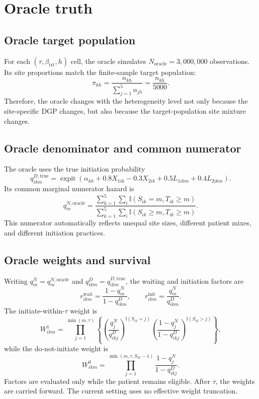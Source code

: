 \documentclass[11pt]{article}
\newcommand{\expit}{\operatorname{expit}}
\newcommand{\ind}{\mathbb{I}}
\begin{document}
\section{Oracle truth}

\subsection{Oracle target population}

For each $(\tau,\beta_{\mathrm{trt}},h)$ cell, the oracle simulates
$N_{\mathrm{oracle}}=3{,}000{,}000$ observations. Its site proportions match
the finite-sample target population:
\begin{equation}
\label{eq:site-weight}
  \pi_{kh}=\frac{n_{kh}}{\sum_{j=1}^5 n_{jh}}
           =\frac{n_{kh}}{5000}.
\end{equation}
Therefore, the oracle changes with the heterogeneity level not only because
the site-specific DGP changes, but also because the target-population site
mixture changes.

\subsection{Oracle denominator and common numerator}

The oracle uses the true initiation probability
\[
  q_{ikm}^{D,\mathrm{true}}
  =\expit\!\left(
      \alpha_{kh}+0.8X_{1ik}-0.3X_{2ik}
      +0.5L_{1ikm}+0.4L_{2ikm}
    \right).
\]
Its common marginal numerator hazard is
\begin{equation}
\label{eq:oracle-num}
  q_m^{N,\mathrm{oracle}}
  =\frac{
      \sum_{k=1}^5\sum_i
      \ind(S_{ik}=m,T_{ik}\geq m)
    }{
      \sum_{k=1}^5\sum_i
      \ind(S_{ik}\geq m,T_{ik}\geq m)
    }.
\end{equation}
This numerator automatically reflects unequal site sizes, different patient
mixes, and different initiation practices.

\subsection{Oracle weights and survival}

Writing $q_m^N=q_m^{N,\mathrm{oracle}}$ and
$q_{ikm}^D=q_{ikm}^{D,\mathrm{true}}$, the waiting and initiation factors are
\[
  r^{\mathrm{wait}}_{ikm}
  =\frac{1-q_m^N}{1-q_{ikm}^D},
  \qquad
  r^{\mathrm{init}}_{ikm}
  =\frac{q_m^N}{q_{ikm}^D}.
\]
The initiate-within-$\tau$ weight is
\begin{equation}
\label{eq:w1}
  W^1_{ikm}
  =\prod_{j=1}^{\min(m,\tau)}
    \left\{
      \left(\frac{q_j^N}{q_{ikj}^D}\right)^{\ind(S_{ik}=j)}
      \left(\frac{1-q_j^N}{1-q_{ikj}^D}\right)^{\ind(S_{ik}>j)}
    \right\},
\end{equation}
while the do-not-initiate weight is
\begin{equation}
\label{eq:w0}
  W^0_{ikm}
  =\prod_{j=1}^{\min(m,\tau,S_{ik}-1)}
     \frac{1-q_j^N}{1-q_{ikj}^D}.
\end{equation}
Factors are evaluated only while the patient remains eligible. After $\tau$,
the weights are carried forward. The current setting uses no effective weight
truncation.
\end{document}
